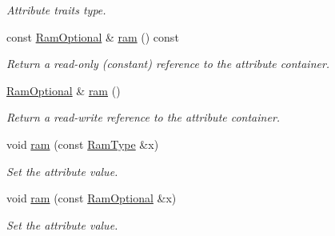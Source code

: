 \begin{DoxyCompactItemize}
\begin{DoxyCompactList}\small\item\em Attribute traits type. \item\end{DoxyCompactList}\item 
const \hyperlink{classopenstack_1_1xml_1_1Flavor_a6d9711f96a65ecfa199168e92a3cdfee}{RamOptional} \& \hyperlink{classopenstack_1_1xml_1_1Flavor_a33bd39b77e853b53d125b3ccb3104cc9}{ram} () const 
\begin{DoxyCompactList}\small\item\em Return a read-\/only (constant) reference to the attribute container. \item\end{DoxyCompactList}\item 
\hyperlink{classopenstack_1_1xml_1_1Flavor_a6d9711f96a65ecfa199168e92a3cdfee}{RamOptional} \& \hyperlink{classopenstack_1_1xml_1_1Flavor_a2b2bbbf805a105b9361104aa5599ce09}{ram} ()
\begin{DoxyCompactList}\small\item\em Return a read-\/write reference to the attribute container. \item\end{DoxyCompactList}\item 
void \hyperlink{classopenstack_1_1xml_1_1Flavor_a5cc6ea5243f60e76b1d1f6620f559fb1}{ram} (const \hyperlink{classopenstack_1_1xml_1_1Flavor_a48035709babf5ce616fd582e7bb753b5}{RamType} \&x)
\begin{DoxyCompactList}\small\item\em Set the attribute value. \item\end{DoxyCompactList}\item 
void \hyperlink{classopenstack_1_1xml_1_1Flavor_a3bcf485f664bb17ddd745690ece86afb}{ram} (const \hyperlink{classopenstack_1_1xml_1_1Flavor_a6d9711f96a65ecfa199168e92a3cdfee}{RamOptional} \&x)
\begin{DoxyCompactList}\small\item\em Set the attribute value. \item\end{DoxyCompactList}\end{DoxyCompactItemize}
